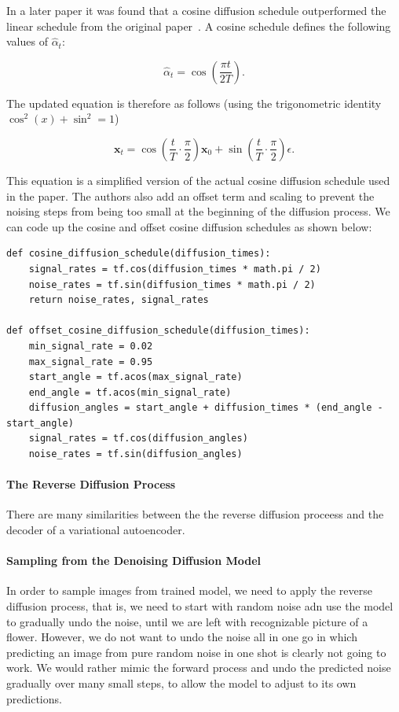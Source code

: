 In a later paper it was found that a cosine diffusion schedule outperformed the linear schedule from the original paper~\cite{hoogeboom2021autoregressive}.
A cosine schedule defines the following values of \( \hat{\alpha}_t \):

\[
	\hat{\alpha}_t = \cos \left(\frac{\pi t}{2T}\right)
	.\]

The updated equation is therefore as follows (using the trigonometric identity \( \cos ^{2} \left(x\right) + \sin ^2 = 1  \))

\[
	\mathbf{x}_t = \cos \left(\frac{t}{T} \cdot \frac{\pi }{2}\right) \mathbf{x}_0 + \sin \left(\frac{t}{T} \cdot \frac{\pi}{2}\right) \epsilon
	.\]


This equation is a simplified version of the actual cosine diffusion schedule used in the paper.
The authors also add an offset term and scaling to prevent the noising steps from being too small at the beginning of the diffusion process.
We can code up the cosine and offset cosine diffusion schedules as shown below:

\begin{verbatim}
def cosine_diffusion_schedule(diffusion_times):
    signal_rates = tf.cos(diffusion_times * math.pi / 2)
    noise_rates = tf.sin(diffusion_times * math.pi / 2)
    return noise_rates, signal_rates

def offset_cosine_diffusion_schedule(diffusion_times):
    min_signal_rate = 0.02
    max_signal_rate = 0.95
    start_angle = tf.acos(max_signal_rate)
    end_angle = tf.acos(min_signal_rate)
    diffusion_angles = start_angle + diffusion_times * (end_angle - start_angle)
    signal_rates = tf.cos(diffusion_angles)
    noise_rates = tf.sin(diffusion_angles)
\end{verbatim}

\paragraph{The Reverse Diffusion Process}

There are many similarities between the the reverse diffusion proceess and the decoder of a variational autoencoder.


\paragraph{Sampling from the Denoising Diffusion Model}

In order to sample images from trained model, we need to apply the reverse diffusion process, that is, we need to start with random noise adn use the model to gradually undo the noise, until we are left with recognizable picture of a flower.
However, we do not want to undo the noise all in one go in which predicting an image from pure random noise in one shot is clearly not going to work.
We would rather mimic the forward process and undo the predicted noise gradually over many small steps, to allow the model to adjust to its own predictions.

